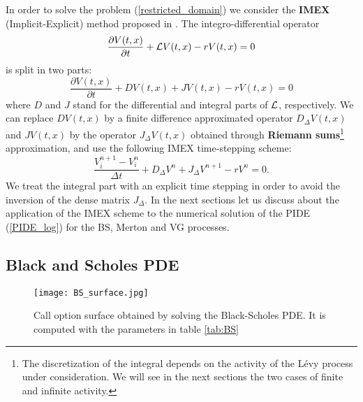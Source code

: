In order to solve the problem (\ref{restricted_domain}) we consider the \textbf{IMEX} (Implicit-Explicit) method proposed in \cite{CoVo05b}.
The integro-differential operator 
$$ \frac{\partial V(t,x)}{\partial t} + \mathcal{L} V(t,x) -r V(t,x) = 0 $$
is split in two parts:
$$ \frac{\partial V(t,x)}{\partial t} + D V(t,x) + J V(t,x) -r V(t,x) = 0 $$
where $D$ and $J$ stand for the differential and integral parts of $\mathcal{L}$, respectively. We can replace $D V(t,x)$ by a finite difference approximated operator $D_{\Delta} V(t,x)$ 
and $J V(t,x)$
by the operator $J_{\Delta} V(t,x)$ obtained through \textbf{Riemann sums}\footnote{The discretization of the integral depends on the activity of the Lévy process under consideration.
We will see in the next sections the two cases of finite and infinite activity.} approximation, and use the following IMEX time-stepping scheme:
\begin{equation}
 \frac{V^{n+1}_{i} -V^{n}_{i}}{\Delta t} + D_{\Delta} V^{n} + J_{\Delta} V^{n+1} - r V^{n} = 0. 
\end{equation}
We treat the integral part with an explicit time stepping in order to avoid the inversion of the dense matrix $J_{\Delta}$. 
In the next sections let us discuss about the application of the IMEX scheme to the numerical solution of the PIDE (\ref{PIDE_log}) for the BS, Merton and VG processes. 


\subsection{Black and Scholes PDE}

\begin{figure}[t]
   \centering
   \texttt{[image: BS\_surface.jpg]}
   \caption{Call option surface obtained by solving the Black-Scholes PDE. It is computed with the parameters in table \ref{tab:BS}}
   \label{BS_surface} 
\end{figure}

